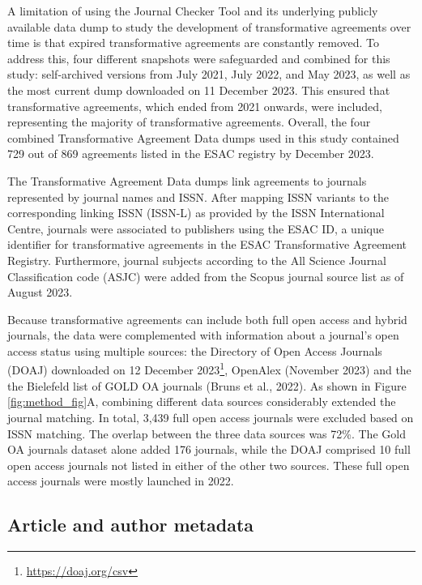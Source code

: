 \documentclass[a4paper,man,floatsintext,longtable,noextraspace,12pt]{apa6}
\begin{document}
A limitation of using the Journal Checker Tool and its underlying
publicly available data dump to study the development of transformative
agreements over time is that expired transformative agreements are
constantly removed. To address this, four different snapshots were
safeguarded and combined for this study: self-archived versions from
July 2021, July 2022, and May 2023, as well as the most current dump
downloaded on 11 December 2023. This ensured that transformative
agreements, which ended from 2021 onwards, were included, representing
the majority of transformative agreements. Overall, the four combined
Transformative Agreement Data dumps used in this study contained 729 out
of 869 agreements listed in the ESAC registry by December 2023.

The Transformative Agreement Data dumps link agreements to journals
represented by journal names and ISSN. After mapping ISSN variants to
the corresponding linking ISSN (ISSN-L) as provided by the ISSN
International Centre, journals were associated to publishers using the
ESAC ID, a unique identifier for transformative agreements in the ESAC
Transformative Agreement Registry. Furthermore, journal subjects
according to the All Science Journal Classification code (ASJC) were
added from the Scopus journal source list as of August 2023.

Because transformative agreements can include both full open access and
hybrid journals, the data were complemented with information about a
journal's open access status using multiple sources: the Directory of
Open Access Journals (DOAJ) downloaded on 12 December 2023\footnote{\url{https://doaj.org/csv}},
OpenAlex (November 2023) and the the Bielefeld list of GOLD OA journals
(Bruns et al., 2022). As shown in Figure \ref{fig:method_fig}A,
combining different data sources considerably extended the journal
matching. In total, 3,439 full open access journals were excluded based
on ISSN matching. The overlap between the three data sources was 72\%.
The Gold OA journals dataset alone added 176 journals, while the DOAJ
comprised 10 full open access journals not listed in either of the other
two sources. These full open access journals were mostly launched in
2022.

\hypertarget{article-and-author-metadata}{%
\subsection{Article and author
metadata}\label{article-and-author-metadata}}
\end{document}
